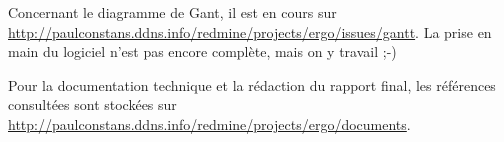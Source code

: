 \documentclass[12pt]{cours}
\begin{document}
Concernant le diagramme de Gant, il est en cours sur \url{http://paulconstans.ddns.info/redmine/projects/ergo/issues/gantt}. La prise en main du logiciel n'est pas encore complète, mais on y travail ;-)

Pour la documentation technique et la rédaction du rapport final, les références consultées sont stockées sur \url{http://paulconstans.ddns.info/redmine/projects/ergo/documents}.
\end{document}
